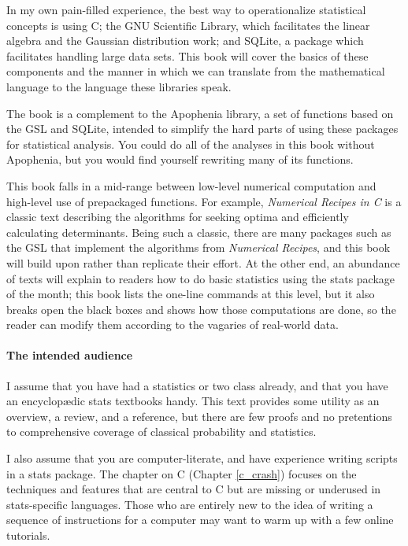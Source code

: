 \documentclass[12pt,notitlepage, openany]{book}
\begin{document}
In my own pain-filled experience, the best way to operationalize
statistical concepts is using C; the GNU Scientific Library,  which
facilitates the linear algebra and the Gaussian distribution work;
and SQLite, a package which facilitates handling large data sets. This
book will cover the basics of these components and the manner in which
we can translate from the mathematical language to the language these
libraries speak.

The book is a complement to the Apophenia library, a set of functions 
based on the GSL and SQLite, intended to simplify the hard parts of
using these packages for statistical analysis. You could do all of the
analyses in this book without Apophenia, but you would find yourself
rewriting many of its functions. 

This book falls in a mid-range between low-level numerical
computation and high-level use of prepackaged functions. For example,
{\sl Numerical Recipes in C} \citep{recipesinc} is a classic text
describing the algorithms for seeking optima and efficiently calculating
determinants. Being such a classic, there are many packages such as the
GSL that implement the algorithms from {\sl Numerical Recipes}, and this
book will build upon rather than replicate their effort. At the other
end, an abundance of texts will explain to readers how to do basic
statistics using the stats package of the month; this book lists the
one-line commands at this level, but it also breaks open the black boxes
and shows how those computations are done, so the reader can modify them
according to the vagaries of real-world data.

\paragraph{The intended audience}
I assume that you have had a statistics or two class already, and that
you have an encyclop\ae{}dic stats textbooks handy. This
text provides some utility as an overview, a review, and a reference,
but there are few proofs and no pretentions to comprehensive coverage of
classical probability and statistics.

I also assume that you are computer-literate, and have experience writing
scripts in a stats package. The chapter on C (Chapter \ref{c_crash})
focuses on the techniques and features that are central to C but are
missing or underused in stats-specific languages. Those who are entirely
new to the idea of writing a sequence of instructions for a computer
may want to warm up with a few online tutorials.
\end{document}
